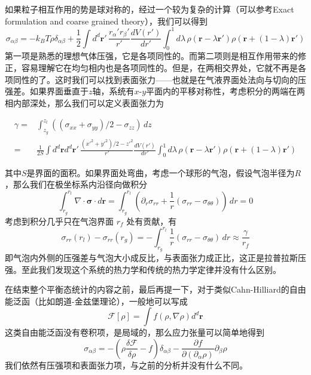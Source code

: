 \documentclass{ctexart}
\newcommand\non{\nonumber \\}
\begin{document}
如果粒子相互作用的势是球对称的，经过一个较为复杂的计算（可以参考Exact formulation and coarse grained theory），我们可以得到
\begin{equation}
\sigma_{\alpha\beta}=-k_BT\rho\delta_{\alpha\beta}+\frac{1}{2}\int d^d\bm{r'}\,\frac{r_\alpha' r_\beta'}{r'}\frac{dV(r')}{dr'}\int_0^1d\lambda\,\rho(\bm{r}-\lambda\bm{r}')\rho(\bm{r}+(1-\lambda)\bm{r}')
\end{equation}
第一项是熟悉的理想气体压强，它是各项同性的。而第二项则是相互作用带来的修正，容易理解它在均匀相内也是各项同性的。但是，在两相交界处，它就不再是各项同性的了。这时我们可以找到表面张力——也就是在气液界面处法向与切向的压强差。如果界面垂直于$z$轴，系统有$x$-$y$平面内的平移对称性，考虑积分的两端在两相内部深处，那么我们可以定义表面张力为

\begin{align} 
\gamma=&\int_{z_g}^{z_l}((\sigma_{xx}+\sigma_{yy})/2-\sigma_{zz})\,dz \non 
=&\frac{1}{2S}\int d^d\bm{r}d^d\bm{r}'\, \frac{(x'^2+y'^2)/2-z'^2}{r'}\frac{dV(r')}{dr'}\int_0^1d\lambda\,\rho(\bm{r}-\lambda\bm{r}')\rho(\bm{r}+(1-\lambda)\bm{r}')
 \end{align}

其中$S$是界面的面积。如果界面处弯曲，考虑一个球形的气泡，假设气泡半径为$R$，那么我们在极坐标系内沿径向做积分
\begin{equation}
\int_{r_g}^{r_l}\nabla\cdot\bm{\sigma}\cdot d\bm{r}=\int_{r_g}^{r_l}\left(\partial_r\sigma_{rr}+\frac{1}{r}(\sigma_{rr}-\sigma_{\theta\theta})\right)\,dr=0
\end{equation}
考虑到积分几乎只在气泡界面 $r_f$ 处有贡献，有
\begin{equation}
\sigma_{rr}(r_l)-\sigma_{rr}(r_g)=-\int_{r_g}^{r_l}\frac{1}{r}(\sigma_{rr}-\sigma_{\theta\theta})\,dr\approx\frac{\gamma}{r_f}
\end{equation}
即气泡内外侧的压强差与气泡大小成反比，与表面张力成正比，这正是拉普拉斯压强。至此我们发现这个系统的热力学和传统的热力学定律并没有什么区别。

在结束整个平衡态统计的内容之前，最后再提一下，对于类似Cahn-Hilliard的自由能泛函（比如朗道-金兹堡理论），一般地可以写成
\begin{equation}
\mathcal{F}[\rho]=\int f(\rho,\nabla\rho)d^d\bm{r}
\end{equation}
这类自由能泛函没有卷积项，是局域的，那么应力张量可以简单地得到
\begin{equation}
\sigma_{\alpha\beta}=-\left(\rho\frac{\delta\mathcal{F}}{\delta\rho}-f\right)\delta_{\alpha\beta}-\frac{\partial f}{\partial(\partial_\alpha\rho)}\partial_\beta\rho
\end{equation}
我们依然有压强项和表面张力项，与之前的分析并没有什么不同。
\end{document}
